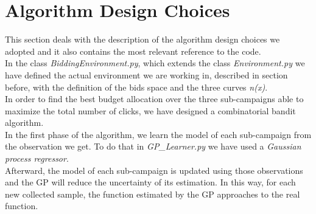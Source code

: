 \section{Algorithm Design Choices}

This section deals with the description of the algorithm design choices we adopted and
it also contains the most relevant reference to the code.\\
In the class \textit{BiddingEnvironment.py}, which extends the class \textit{Environment.py} we have defined the actual environment we are working in, described in section before, with the definition of the bids space and the three curves \textit{n(x)}.\\
In order to find the best budget allocation over the three sub-campaigns able to maximize the total number of clicks, we have designed a combinatorial bandit algorithm.\\
In the first phase of the algorithm, we learn the model of each sub-campaign from the observation we get.
To do that in \textit{GP\_Learner.py} we have used a \textit{Gaussian process regressor}.\\
Afterward, the model of each sub-campaign is updated using those observations and the GP will reduce the uncertainty of its estimation. In this way, for each new collected sample, the function estimated by the GP approaches to the real function.\\



